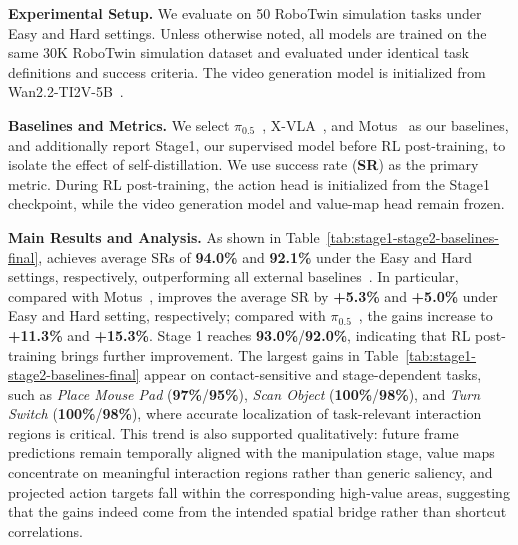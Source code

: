 

\noindent\textbf{Experimental Setup.}
We evaluate \method on 50 RoboTwin simulation tasks under Easy and Hard settings. Unless otherwise noted, all models are trained on the same 30K RoboTwin simulation dataset and evaluated under identical task definitions and success criteria. The video generation model is initialized from Wan2.2-TI2V-5B~\cite{wan2025wan}.

\noindent\textbf{Baselines and Metrics.}
We select $\pi_{0.5}$~\cite{pi05}, X-VLA~\cite{xVLA}, and Motus~\cite{bi2025motusunifiedlatentaction} as our baselines, and additionally report Stage1, our supervised model before RL post-training, to isolate the effect of self-distillation. We use success rate (\textbf{SR}) as the primary metric. During RL post-training, the action head is initialized from the Stage1 checkpoint, while the video generation model and value-map head remain frozen.

\noindent\textbf{Main Results and Analysis.}
As shown in Table~\ref{tab:stage1-stage2-baselines-final}, \method achieves average SRs of \textbf{94.0\%} and \textbf{92.1\%} under the Easy and Hard settings, respectively, outperforming all external baselines~\cite{xVLA,pi0,pi05,bi2025motusunifiedlatentaction,yuan2026fastwam,gigaworld,li2026causal}. In particular, compared with Motus~\cite{bi2025motusunifiedlatentaction}, \method improves the average SR by \textbf{+5.3\%} and \textbf{+5.0\%} under Easy and Hard setting, respectively; compared with $\pi_{0.5}$~\cite{pi05}, the gains increase to \textbf{+11.3\%} and \textbf{+15.3\%}. Stage 1 reaches \textbf{93.0\%}/\textbf{92.0\%}, indicating that RL post-training brings further improvement. The largest gains in Table~\ref{tab:stage1-stage2-baselines-final} appear on contact-sensitive and stage-dependent tasks, such as \emph{Place Mouse Pad} (\textbf{97\%}/\textbf{95\%}), \emph{Scan Object} (\textbf{100\%}/\textbf{98\%}), and \emph{Turn Switch} (\textbf{100\%}/\textbf{98\%}), where accurate localization of task-relevant interaction regions is critical. This trend is also supported qualitatively: future frame predictions remain temporally aligned with the manipulation stage, value maps concentrate on meaningful interaction regions rather than generic saliency, and projected action targets fall within the corresponding high-value areas, suggesting that the gains indeed come from the intended spatial bridge rather than shortcut correlations.

